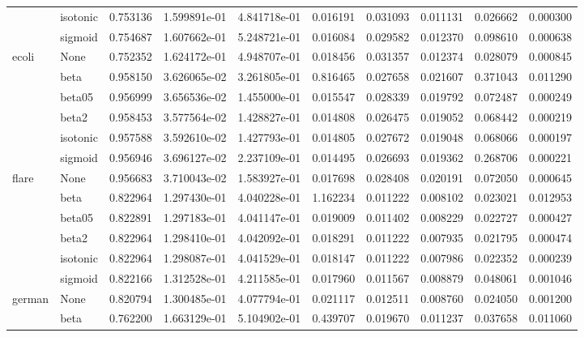 \begin{tabular}{llrrrrrrrr}
        & isotonic &  0.753136 &  1.599891e-01 &  4.841718e-01 &   0.016191 &  0.031093 &  0.011131 &  0.026662 &  0.000300 \\
        & sigmoid &  0.754687 &  1.607662e-01 &  5.248721e-01 &   0.016084 &  0.029582 &  0.012370 &  0.098610 &  0.000638 \\
ecoli & None &  0.752352 &  1.624172e-01 &  4.948707e-01 &   0.018456 &  0.031357 &  0.012374 &  0.028079 &  0.000845 \\
        & beta &  0.958150 &  3.626065e-02 &  3.261805e-01 &   0.816465 &  0.027658 &  0.021607 &  0.371043 &  0.011290 \\
        & beta05 &  0.956999 &  3.656536e-02 &  1.455000e-01 &   0.015547 &  0.028339 &  0.019792 &  0.072487 &  0.000249 \\
        & beta2 &  0.958453 &  3.577564e-02 &  1.428827e-01 &   0.014808 &  0.026475 &  0.019052 &  0.068442 &  0.000219 \\
        & isotonic &  0.957588 &  3.592610e-02 &  1.427793e-01 &   0.014805 &  0.027672 &  0.019048 &  0.068066 &  0.000197 \\
        & sigmoid &  0.956946 &  3.696127e-02 &  2.237109e-01 &   0.014495 &  0.026693 &  0.019362 &  0.268706 &  0.000221 \\
flare & None &  0.956683 &  3.710043e-02 &  1.583927e-01 &   0.017698 &  0.028408 &  0.020191 &  0.072050 &  0.000645 \\
        & beta &  0.822964 &  1.297430e-01 &  4.040228e-01 &   1.162234 &  0.011222 &  0.008102 &  0.023021 &  0.012953 \\
        & beta05 &  0.822891 &  1.297183e-01 &  4.041147e-01 &   0.019009 &  0.011402 &  0.008229 &  0.022727 &  0.000427 \\
        & beta2 &  0.822964 &  1.298410e-01 &  4.042092e-01 &   0.018291 &  0.011222 &  0.007935 &  0.021795 &  0.000474 \\
        & isotonic &  0.822964 &  1.298087e-01 &  4.041529e-01 &   0.018147 &  0.011222 &  0.007986 &  0.022352 &  0.000239 \\
        & sigmoid &  0.822166 &  1.312528e-01 &  4.211585e-01 &   0.017960 &  0.011567 &  0.008879 &  0.048061 &  0.001046 \\
german & None &  0.820794 &  1.300485e-01 &  4.077794e-01 &   0.021117 &  0.012511 &  0.008760 &  0.024050 &  0.001200 \\
        & beta &  0.762200 &  1.663129e-01 &  5.104902e-01 &   0.439707 &  0.019670 &  0.011237 &  0.037658 &  0.011060 \\

\end{tabular}
